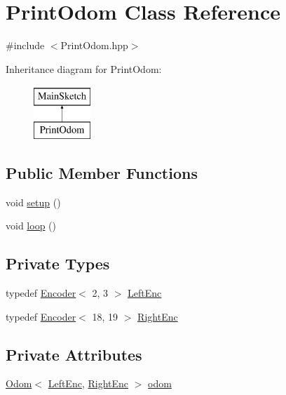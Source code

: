 \hypertarget{classPrintOdom}{\section{Print\-Odom Class Reference}
\label{classPrintOdom}
}


{\ttfamily \#include $<$Print\-Odom.\-hpp$>$}

Inheritance diagram for Print\-Odom\-:\begin{figure}[H]
\begin{center}
\leavevmode
\includegraphics[height=2.000000cm]{classPrintOdom}
\end{center}
\end{figure}
\subsection*{Public Member Functions}
\begin{DoxyCompactItemize}
\item 
void \hyperlink{classPrintOdom_ae99dc882b588ebd47873b7455da5f50a}{setup} ()
\item 
void \hyperlink{classPrintOdom_a4b2515b27a03cb3b143256a52acd5a0c}{loop} ()
\end{DoxyCompactItemize}
\subsection*{Private Types}
\begin{DoxyCompactItemize}
\item 
typedef \hyperlink{classEncoder}{Encoder}$<$ 2, 3 $>$ \hyperlink{classPrintOdom_a6888479f567846e63b00665fe95c4073}{Left\-Enc}
\item 
typedef \hyperlink{classEncoder}{Encoder}$<$ 18, 19 $>$ \hyperlink{classPrintOdom_ac090b58cc7388d8f2e26d5b7c912f383}{Right\-Enc}
\end{DoxyCompactItemize}
\subsection*{Private Attributes}
\begin{DoxyCompactItemize}
\item 
\hyperlink{classOdom}{Odom}$<$ \hyperlink{classPrintOdom_a6888479f567846e63b00665fe95c4073}{Left\-Enc}, \hyperlink{classPrintOdom_ac090b58cc7388d8f2e26d5b7c912f383}{Right\-Enc} $>$ \hyperlink{classPrintOdom_a4741396ec009336b54896ade384b102d}{odom}
\end{DoxyCompactItemize}


